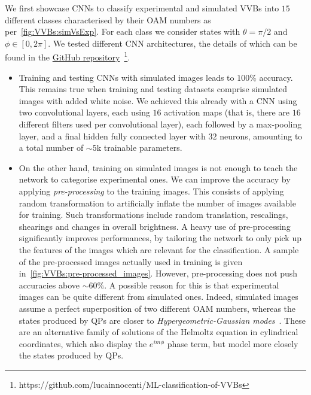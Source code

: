 We first showcase CNNs to classify experimental and simulated VVBs into $15$ different classes characterised by their OAM numbers as per~\cref{fig:VVBs:simVsExp}.
For each class we consider states with $\theta=\pi/2$ and $\phi\in[0,2\pi]$.
We tested different CNN architectures, the details of which can be found in the \href{https://github.com/lucainnocenti/ML-classification-of-VVBs}{GitHub repository}~\footnote{https://github.com/lucainnocenti/ML-classification-of-VVBs}.
\begin{itemize}
	\item Training and testing CNNs with simulated images leads to $100\%$ accuracy. This remains true when training and testing datasets comprise simulated images with added white noise.
	We achieved this already with a CNN using two convolutional layers, each using $16$ activation maps (that is, there are $16$ different filters used per convolutional layer), each followed by a max-pooling layer, and a final hidden fully connected layer with $32$ neurons, amounting to a total number of $\sim5$k trainable parameters.
	\item On the other hand, training on simulated images is not enough to teach the network to categorise experimental ones.
	We can improve the accuracy by applying \emph{pre-processing} to the training images. This consists of applying random transformation to artificially inflate the number of images available for training. Such transformations include random translation, rescalings, shearings and changes in overall brightness. A heavy use of pre-processing significantly improves performances, by tailoring the network to only pick up the features of the images which are relevant for the classification.
	A sample of the pre-processed images actually used in training is given in~\cref{fig:VVBs:pre-processed_images}.
	However, pre-processing does not push accuracies above $\sim60\%$.
	A possible reason for this is that experimental images can be quite different from simulated ones. Indeed, simulated images assume a perfect superposition of two different OAM numbers, whereas the states produced by \acp{QP} are closer to \emph{Hypergeometric-Gaussian modes}~\cite{karimi2007hypergeometricgaussian}. These are an alternative family of solutions of the Helmoltz equation in cylindrical coordinates, which also display the $e^{im\phi}$ phase term, but model more closely the states produced by \acp{QP}.

\end{itemize}
